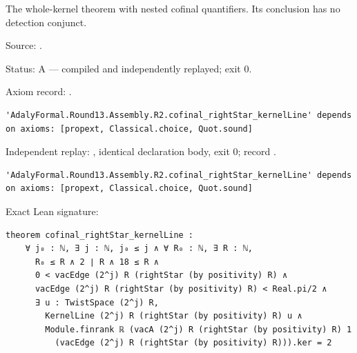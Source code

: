 \begin{theorem}[bp-577]
\label{bp-577}
\leanok
The whole-kernel theorem with nested cofinal quantifiers. Its conclusion has no detection conjunct.

\par Source: \texttt{}.
\par Status: A — compiled and independently replayed; exit 0.
\par Axiom record: \texttt{}.
\begin{verbatim}
'AdalyFormal.Round13.Assembly.R2.cofinal_rightStar_kernelLine' depends on axioms: [propext, Classical.choice, Quot.sound]
\end{verbatim}
\par Independent replay: \texttt{}, identical declaration body, exit 0; record \texttt{}.
\begin{verbatim}
'AdalyFormal.Round13.Assembly.R2.cofinal_rightStar_kernelLine' depends on axioms: [propext, Classical.choice, Quot.sound]
\end{verbatim}
\par Exact Lean signature:
\begin{verbatim}
theorem cofinal_rightStar_kernelLine :
    ∀ j₀ : ℕ, ∃ j : ℕ, j₀ ≤ j ∧ ∀ R₀ : ℕ, ∃ R : ℕ,
      R₀ ≤ R ∧ 2 ∣ R ∧ 18 ≤ R ∧
      0 < vacEdge (2^j) R (rightStar (by positivity) R) ∧
      vacEdge (2^j) R (rightStar (by positivity) R) < Real.pi/2 ∧
      ∃ u : TwistSpace (2^j) R,
        KernelLine (2^j) R (rightStar (by positivity) R) u ∧
        Module.finrank ℝ (vacA (2^j) R (rightStar (by positivity) R) 1
          (vacEdge (2^j) R (rightStar (by positivity) R))).ker = 2
\end{verbatim}
\end{theorem}

